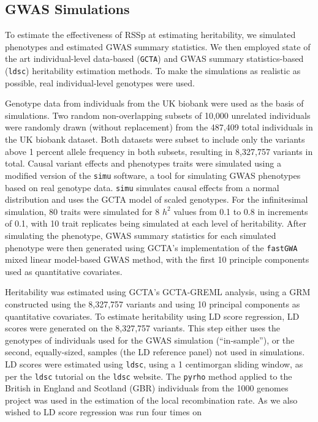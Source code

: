 \subsection{GWAS Simulations}
To estimate the effectiveness of RSSp at estimating heritability, we simulated phenotypes and estimated GWAS summary statistics. We then employed state of the art individual-level data-based (\texttt{GCTA}\cite{GCTA}) and GWAS summary statistics-based (\texttt{ldsc}\cite{ldsc}) heritability estimation methods.  To make the simulations as realistic as possible, real individual-level genotypes were used.

Genotype data from individuals from the UK biobank were used as the basis of simulations. Two random non-overlapping subsets of 10,000 unrelated individuals were randomly drawn (without replacement) from the 487,409 total individuals in the UK biobank dataset.  Both datasets were subset to include only the variants above 1 percent allele frequency in both subsets, resulting in 8,327,757 variants in total.
Causal variant effects and phenotypes traits were simulated using a modified version of the \texttt{simu} software, a tool for simulating GWAS phenotypes based on real genotype data.  \texttt{simu} simulates causal effects from a normal distribution and uses the GCTA model of scaled genotypes. For the infinitesimal simulation, 80 traits were simulated for 8 $h^2$ values from  0.1 to 0.8 in increments of 0.1, with 10 trait replicates being simulated at each level of heritability. After simulating the phenotype, GWAS summary statistics for each simulated phenotype were then generated using GCTA's implementation of the \texttt{fastGWA} mixed linear model-based GWAS method, with the first 10 principle components used as quantitative covariates. 

Heritability was estimated using GCTA's GCTA-GREML analysis, using a GRM constructed using the 8,327,757 variants and using 10 principal components as quantitative covariates. 
To estimate heritability using LD score regression, LD scores were generated on the 8,327,757 variants.  This step either uses the genotypes of individuals used for the GWAS simulation (``in-sample''), or the second, equally-sized, samples (the LD reference panel) not used in simulations.  LD scores were estimated using \texttt{ldsc}, using a 1 centimorgan sliding window, as per the \texttt{ldsc} tutorial \cite{ldsctutorial} on the \texttt{ldsc} website.  The \texttt{pyrho} method applied to the British in England and Scotland (GBR) individuals from the 1000 genomes project\cite{1kg} was used in the estimation of the local recombination rate.  As we also wished to LD score regression was run four times on 

